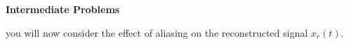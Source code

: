 \begin{LARGE}
  \textbf{Intermediate Problems}
\end{LARGE}

you will now consider the effect of aliasing on the reconstructed signal $x_r(t)$.
